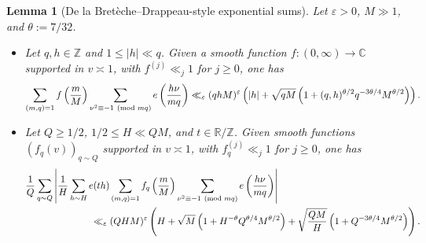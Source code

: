 \documentclass[reqno,11pt]{amsart}
\newtheorem{lemma}[theorem]{Lemma}
\theoremstyle{remark}
\numberwithin{equation}{section}
\newcommand{\Z}{\mathbb{Z}}
\newcommand{\R}{\mathbb{R}}
\newcommand{\C}{\mathbb{C}}
\newcommand{\eps}{\varepsilon}
\renewcommand{\pmod}[1]{\ (\textnormal{mod } #1)}
\begin{document}
\begin{lemma}[De la Bret\`eche--Drappeau-style exponential sums] \label{lem:improvement-bd}
Let $\eps > 0$, $M \gg 1$, and $\theta := 7/32$.
\begin{itemize}
    \item[$(i)$.] Let $q, h \in \Z$ and $1 \le |h| \ll q$. Given a smooth function $f : (0, \infty) \to \C$ supported in $v \asymp 1$, with $f^{(j)} \ll_j 1$ for $j \ge 0$, one has
\begin{equation} \label{eq:bd-1}
    \sum_{(m, q) = 1} f\left(\frac{m}{M}\right) 
    \sum_{\nu^2 \equiv -1 \pmod{mq}}
    e\left(\frac{h\nu}{mq}\right) 
    \ll_\eps  
    (qhM)^\eps \left(
    |h| + \sqrt{qM}\left(1 + (q, h)^{\theta/2} q^{- 3\theta/4} M^{\theta/2} \right) \right).
\end{equation}
    \item[$(ii)$.] Let $Q \ge 1/2$, $1/2 \le H \ll QM$, and $t \in \R/\Z$. Given smooth functions $(f_q(v))_{q \sim Q}$ supported in $v \asymp 1$, with $f_q^{(j)} \ll_j 1$ for $j \ge 0$, one has
\begin{equation} \label{eq:bd-2}
\begin{aligned}
    \frac{1}{Q} \sum_{q \sim Q}
    &\left\vert \frac{1}{H} \sum_{h \sim H} e(th) 
    \sum_{(m, q) = 1} f_q\left(\frac{m}{M}\right) 
    \sum_{\nu^2 \equiv -1 \pmod{mq}}
    e\left(\frac{h\nu}{mq}\right) 
    \right\vert
    \\
    &\qquad \qquad \ll_\eps  
    (QHM)^\eps \left(
    H + \sqrt{M} \left(1 + H^{-\theta} Q^{\theta/4} M^{\theta/2}\right) + \sqrt{\frac{QM}{H}}\left(1 + Q^{-3\theta/4} M^{\theta/2} \right)\right).
\end{aligned}
\end{equation}
\end{itemize}
\end{lemma}
\end{document}
